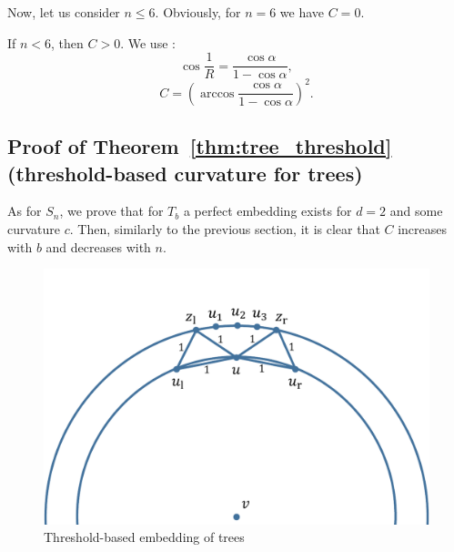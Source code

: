 \documentclass{article} %
\begin{document}
Now, let us consider $n \le 6$. Obviously, for $n = 6$ we have $C = 0$.

If $n < 6$, then $C > 0$. We use :
\[
\cos{\frac{1}{R}} = \frac{\cos \alpha}{1 - \cos \alpha},
\]
\[
C = \left(\arccos \frac{\cos \alpha}{1 - \cos \alpha}\right)^2.
\]




\subsection{Proof of Theorem~\ref{thm:tree_threshold} (threshold-based curvature for trees)}\label{app:tree_threshold}



As for $S_n$, we prove that for $T_b$ a perfect embedding exists for $d = 2$ and some curvature $c$. Then, similarly to the previous section, it is clear that $C$ increases with $b$ and decreases with $n$.


\begin{figure}
    \centering
    \includegraphics[width = 0.5 \textwidth]{trees.pdf}
    \caption{Threshold-based embedding of trees}
    \label{fig:trees}
\end{figure}
\end{document}
